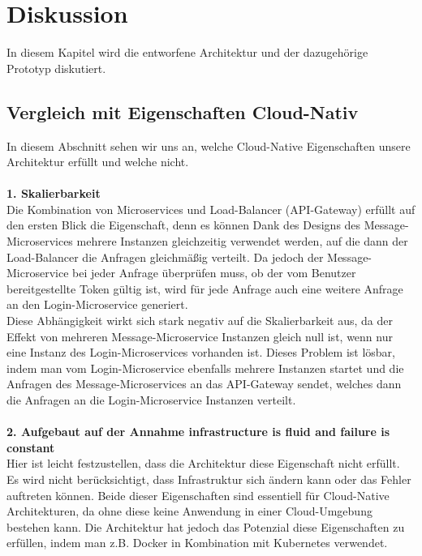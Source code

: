 \chapter{Diskussion}
In diesem Kapitel wird die entworfene Architektur und der dazugehörige Prototyp diskutiert.

\section{Vergleich mit Eigenschaften Cloud-Nativ}
In diesem Abschnitt sehen wir uns an, welche Cloud-Native Eigenschaften unsere Architektur erfüllt und welche nicht.\\
\\
\textbf{1. Skalierbarkeit}\\
Die Kombination von Microservices und Load-Balancer (API-Gateway) erfüllt auf den ersten Blick die Eigenschaft, denn es können Dank des Designs des Message-Microservices mehrere Instanzen gleichzeitig verwendet werden, auf die dann der Load-Balancer die Anfragen gleichmäßig verteilt. Da jedoch der Message-Microservice bei jeder Anfrage überprüfen muss, ob der vom Benutzer bereitgestellte Token gültig ist, wird für jede Anfrage auch eine weitere Anfrage an den Login-Microservice generiert.\\
Diese Abhängigkeit wirkt sich stark negativ auf die Skalierbarkeit aus, da der Effekt von mehreren Message-Microservice Instanzen gleich null ist, wenn nur eine Instanz des Login-Microservices vorhanden ist. Dieses Problem ist lösbar, indem man vom Login-Microservice ebenfalls mehrere Instanzen startet und die Anfragen des Message-Microservices an das API-Gateway sendet, welches dann die Anfragen an die Login-Microservice Instanzen verteilt.\\
\\
\textbf{2. Aufgebaut auf der Annahme \glqq infrastructure is fluid and failure is constant\grqq{}}\\
Hier ist leicht festzustellen, dass die Architektur diese Eigenschaft nicht erfüllt. Es wird nicht berücksichtigt, dass Infrastruktur sich ändern kann oder das Fehler auftreten können. Beide dieser Eigenschaften sind essentiell für Cloud-Native Architekturen, da ohne diese keine Anwendung in einer Cloud-Umgebung bestehen kann. Die Architektur hat jedoch das Potenzial diese Eigenschaften zu erfüllen, indem man z.B. Docker in Kombination mit Kubernetes verwendet.\\

